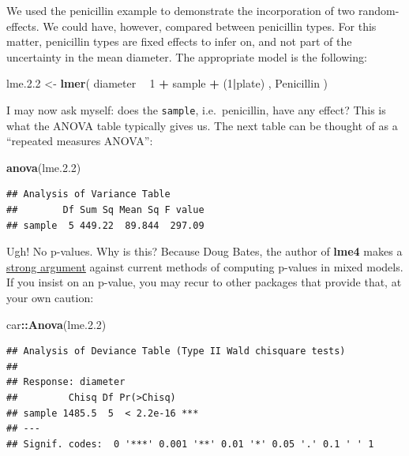 \documentclass[]{book}
\newenvironment{Shaded}{\begin{snugshade}}{\end{snugshade}}
\newcommand{\KeywordTok}[1]{\textcolor[rgb]{0.13,0.29,0.53}{\textbf{#1}}}
\newcommand{\DecValTok}[1]{\textcolor[rgb]{0.00,0.00,0.81}{#1}}
\newcommand{\FloatTok}[1]{\textcolor[rgb]{0.00,0.00,0.81}{#1}}
\newcommand{\StringTok}[1]{\textcolor[rgb]{0.31,0.60,0.02}{#1}}
\newcommand{\OperatorTok}[1]{\textcolor[rgb]{0.81,0.36,0.00}{\textbf{#1}}}
\newcommand{\NormalTok}[1]{#1}
\theoremstyle{definition}
\theoremstyle{definition}
\theoremstyle{definition}
\theoremstyle{remark}
\begin{document}
We used the penicillin example to demonstrate the incorporation of two
random-effects. We could have, however, compared between penicillin
types. For this matter, penicillin types are fixed effects to infer on,
and not part of the uncertainty in the mean diameter. The appropriate
model is the following:

\begin{Shaded}
\begin{Highlighting}[]
\NormalTok{lme.}\FloatTok{2.2}\NormalTok{ <-}\StringTok{ }\KeywordTok{lmer}\NormalTok{( diameter }\OperatorTok{~}\StringTok{  }\DecValTok{1}  \OperatorTok{+}\StringTok{ }\NormalTok{sample }\OperatorTok{+}\StringTok{ }\NormalTok{(}\DecValTok{1}\OperatorTok{|}\NormalTok{plate) , Penicillin )}
\end{Highlighting}
\end{Shaded}

I may now ask myself: does the \texttt{sample}, i.e.~penicillin, have
any effect? This is what the ANOVA table typically gives us. The next
table can be thought of as a ``repeated measures ANOVA'':

\begin{Shaded}
\begin{Highlighting}[]
\KeywordTok{anova}\NormalTok{(lme.}\FloatTok{2.2}\NormalTok{)}
\end{Highlighting}
\end{Shaded}

\begin{verbatim}
## Analysis of Variance Table
##        Df Sum Sq Mean Sq F value
## sample  5 449.22  89.844  297.09
\end{verbatim}

Ugh! No p-values. Why is this? Because Doug Bates, the author of
\textbf{lme4} makes a
\href{https://stat.ethz.ch/pipermail/r-help/2006-May/094765.html}{strong
argument} against current methods of computing p-values in mixed models.
If you insist on an p-value, you may recur to other packages that
provide that, at your own caution:

\begin{Shaded}
\begin{Highlighting}[]
\NormalTok{car}\OperatorTok{::}\KeywordTok{Anova}\NormalTok{(lme.}\FloatTok{2.2}\NormalTok{) }
\end{Highlighting}
\end{Shaded}

\begin{verbatim}
## Analysis of Deviance Table (Type II Wald chisquare tests)
## 
## Response: diameter
##         Chisq Df Pr(>Chisq)    
## sample 1485.5  5  < 2.2e-16 ***
## ---
## Signif. codes:  0 '***' 0.001 '**' 0.01 '*' 0.05 '.' 0.1 ' ' 1
\end{verbatim}
\end{document}
